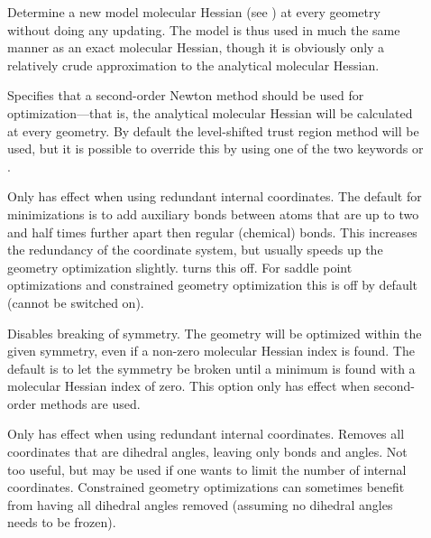 \begin{description}
\item[]
Determine a new model molecular Hessian (see )
at every geometry without doing any updating. The model is thus used
in much the same manner as an exact molecular Hessian, though it is obviously
only a relatively crude approximation to the analytical molecular Hessian.

\item[]
Specifies that a second-order Newton method should be used for
optimization---that is, the analytical molecular Hessian will be calculated at
every geometry. By default the level-shifted trust region method will
be used, but it is possible to override this by using one of the two
keywords  or .

\item[]
Only has effect when using redundant internal coordinates. The default
for minimizations is to add auxiliary bonds between atoms that are up
to two and half times further apart then regular (chemical)
bonds. This increases the redundancy of the coordinate system, but
usually speeds up the geometry optimization slightly. 
turns this off. For saddle point optimizations and constrained
geometry optimization this is off by default (cannot be switched on).

\item[]
Disables breaking of symmetry.
The geometry will be optimized within the given symmetry, even if a non-zero molecular Hessian
index is found. The default is to let the symmetry be broken until
a minimum is found with a molecular Hessian index of
zero. This option only has effect when second-order methods are used.

\item[]
Only has effect when using redundant internal coordinates. Removes all
coordinates that are dihedral angles, leaving only bonds and
angles. Not too useful, but may be used if one wants to limit the
number of internal coordinates. Constrained geometry optimizations can
sometimes benefit from having all dihedral angles removed (assuming no
dihedral angles needs to be frozen).

%


\end{description}
